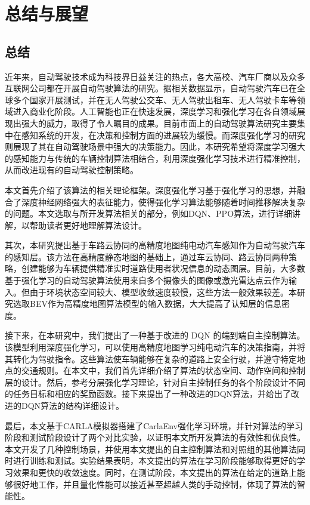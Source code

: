 
\chapter{总结与展望}

\section{总结}

近年来，自动驾驶技术成为科技界日益关注的热点，各大高校、汽车厂商以及众多互联网公司都在开展自动驾驶算法的研究。据相关数据显示，自动驾驶汽车已在全球多个国家开展测试，并在无人驾驶公交车、无人驾驶出租车、无人驾驶卡车等领域进入商业化阶段。人工智能也正在快速发展，深度学习和强化学习在各自领域展现出强大的威力，取得了令人瞩目的成果。目前市面上的自动驾驶算法研究主要集中在感知系统的开发，在决策和控制方面的进展较为缓慢。而深度强化学习的研究则展现了其在自动驾驶场景中强大的决策能力。因此，本研究希望将深度学习强大的感知能力与传统的车辆控制算法相结合，利用深度强化学习技术进行精准控制，从而改进现有的自动驾驶控制策略。

本文首先介绍了该算法的相关理论框架。深度强化学习基于强化学习的思想，并融合了深度神经网络强大的表征能力，使得强化学习算法能够随着时间推移解决复杂的问题。本文选取与所开发算法相关的部分，例如DQN、PPO算法，进行详细讲解，以帮助读者更好地理解算法设计。

其次，本研究提出基于车路云协同的高精度地图纯电动汽车感知作为自动驾驶汽车的感知层。该方法在高精度静态地图的基础上，通过车云协同、路云协同两种策略，创建能够为车辆提供精准实时道路使用者状况信息的动态图层。目前，大多数基于强化学习的自动驾驶算法使用来自多个摄像头的图像或激光雷达点云作为输入。但由于环境状态空间较大、模型收敛速度较慢，这些方法一般效果较差。本研究选取BEV作为高精度地图算法模型的输入数据，大大提高了认知层的信息密度。

接下来，在本研究中，我们提出了一种基于改进的 DQN 的端到端自主控制算法。该模型利用深度强化学习，可以使用高精度地图学习纯电动汽车的决策指南，并将其转化为驾驶指令。这些算法使车辆能够在复杂的道路上安全行驶，并遵守特定地点的交通规则。在本文中，我们首先详细介绍了算法的状态空间、动作空间和控制层的设计。然后，参考分层强化学习理论，针对自主控制任务的各个阶段设计不同的任务目标和相应的奖励函数。接下来提出了一种改进的DQN算法，并给出了改进的DQN算法的结构详细设计。

最后，本文基于CARLA模拟器搭建了CarlaEnv强化学习环境，并针对算法的学习阶段和测试阶段设计了两个对比实验，以证明本文所开发算法的有效性和优良性。本文开发了几种控制场景，并使用本文提出的自主控制算法和对照组的其他算法同时进行训练和测试。实验结果表明，本文提出的算法在学习阶段能够取得更好的学习效果和更快的收敛速度。同时，在测试阶段，本文提出的算法在给定的道路上能够很好地工作，并且量化性能可以接近甚至超越人类的手动控制，体现了算法的智能性。

